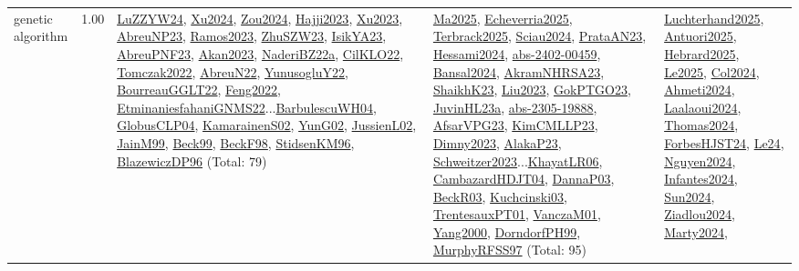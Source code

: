{\begin{longtable}{p{3cm}r>{\raggedright\arraybackslash}p{6cm}>{\raggedright\arraybackslash}p{6cm}>{\raggedright\arraybackslash}p{8cm}}
\index{genetic algorithm}\index{Algorithms!genetic algorithm}genetic algorithm &  1.00 & \hyperref[detail:LuZZYW24]{LuZZYW24}, \hyperref[detail:Xu2024]{Xu2024}, \hyperref[detail:Zou2024]{Zou2024}, \hyperref[detail:Hajji2023]{Hajji2023}, \hyperref[detail:Xu2023]{Xu2023}, \hyperref[detail:AbreuNP23]{AbreuNP23}, \hyperref[detail:Ramos2023]{Ramos2023}, \hyperref[detail:ZhuSZW23]{ZhuSZW23}, \hyperref[detail:IsikYA23]{IsikYA23}, \hyperref[detail:AbreuPNF23]{AbreuPNF23}, \hyperref[detail:Akan2023]{Akan2023}, \hyperref[detail:NaderiBZ22a]{NaderiBZ22a}, \hyperref[detail:CilKLO22]{CilKLO22}, \hyperref[detail:Tomczak2022]{Tomczak2022}, \hyperref[detail:AbreuN22]{AbreuN22}, \hyperref[detail:YunusogluY22]{YunusogluY22}, \hyperref[detail:BourreauGGLT22]{BourreauGGLT22}, \hyperref[detail:Feng2022]{Feng2022}, \hyperref[detail:EtminaniesfahaniGNMS22]{EtminaniesfahaniGNMS22}...\hyperref[detail:BarbulescuWH04]{BarbulescuWH04}, \hyperref[detail:GlobusCLP04]{GlobusCLP04}, \hyperref[detail:KamarainenS02]{KamarainenS02}, \hyperref[detail:YunG02]{YunG02}, \hyperref[detail:JussienL02]{JussienL02}, \hyperref[detail:JainM99]{JainM99}, \hyperref[detail:Beck99]{Beck99}, \hyperref[detail:BeckF98]{BeckF98}, \hyperref[detail:StidsenKM96]{StidsenKM96}, \hyperref[detail:BlazewiczDP96]{BlazewiczDP96} (Total: 79) & \hyperref[detail:Ma2025]{Ma2025}, \hyperref[detail:Echeverria2025]{Echeverria2025}, \hyperref[detail:Terbrack2025]{Terbrack2025}, \hyperref[detail:Sciau2024]{Sciau2024}, \hyperref[detail:PrataAN23]{PrataAN23}, \hyperref[detail:Hessami2024]{Hessami2024}, \hyperref[detail:abs-2402-00459]{abs-2402-00459}, \hyperref[detail:Bansal2024]{Bansal2024}, \hyperref[detail:AkramNHRSA23]{AkramNHRSA23}, \hyperref[detail:ShaikhK23]{ShaikhK23}, \hyperref[detail:Liu2023]{Liu2023}, \hyperref[detail:GokPTGO23]{GokPTGO23}, \hyperref[detail:JuvinHL23a]{JuvinHL23a}, \hyperref[detail:abs-2305-19888]{abs-2305-19888}, \hyperref[detail:AfsarVPG23]{AfsarVPG23}, \hyperref[detail:KimCMLLP23]{KimCMLLP23}, \hyperref[detail:Dimny2023]{Dimny2023}, \hyperref[detail:AlakaP23]{AlakaP23}, \hyperref[detail:Schweitzer2023]{Schweitzer2023}...\hyperref[detail:KhayatLR06]{KhayatLR06}, \hyperref[detail:CambazardHDJT04]{CambazardHDJT04}, \hyperref[detail:DannaP03]{DannaP03}, \hyperref[detail:BeckR03]{BeckR03}, \hyperref[detail:Kuchcinski03]{Kuchcinski03}, \hyperref[detail:TrentesauxPT01]{TrentesauxPT01}, \hyperref[detail:VanczaM01]{VanczaM01}, \hyperref[detail:Yang2000]{Yang2000}, \hyperref[detail:DorndorfPH99]{DorndorfPH99}, \hyperref[detail:MurphyRFSS97]{MurphyRFSS97} (Total: 95) & \hyperref[detail:Luchterhand2025]{Luchterhand2025}, \hyperref[detail:Antuori2025]{Antuori2025}, \hyperref[detail:Hebrard2025]{Hebrard2025}, \hyperref[detail:Le2025]{Le2025}, \hyperref[detail:Col2024]{Col2024}, \hyperref[detail:Ahmeti2024]{Ahmeti2024}, \hyperref[detail:Laalaoui2024]{Laalaoui2024}, \hyperref[detail:Thomas2024]{Thomas2024}, \hyperref[detail:ForbesHJST24]{ForbesHJST24}, \hyperref[detail:Le24]{Le24}, \hyperref[detail:Nguyen2024]{Nguyen2024}, \hyperref[detail:Infantes2024]{Infantes2024}, \hyperref[detail:Sun2024]{Sun2024}, \hyperref[detail:Ziadlou2024]{Ziadlou2024}, \hyperref[detail:Marty2024]{Marty2024}, 
\end{longtable}}
